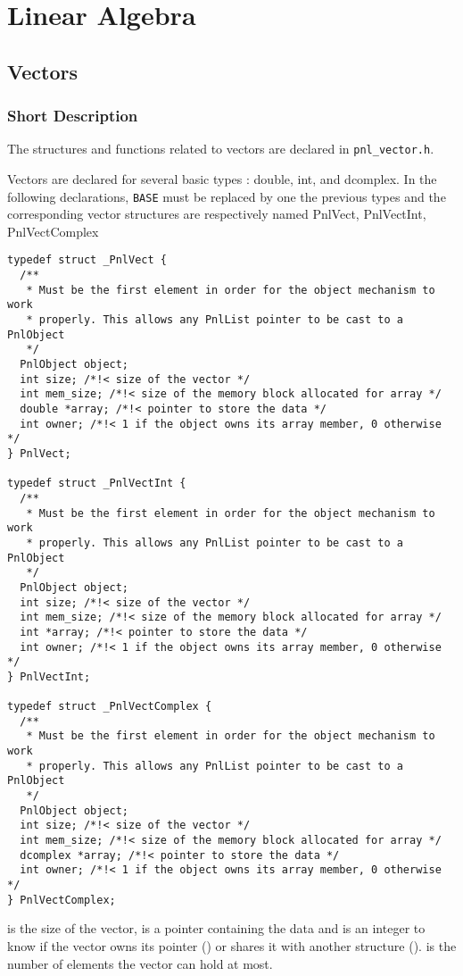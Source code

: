 \section{Linear Algebra}

\subsection{Vectors}
\subsubsection{Short Description}

The structures and functions related to vectors are declared in
\verb!pnl_vector.h!.


Vectors are declared for several basic types : double, int, and
dcomplex. In the following declarations, {\tt BASE} must be replaced by one
the previous types and the corresponding vector structures are respectively
named PnlVect, PnlVectInt, PnlVectComplex
\begin{verbatim}
typedef struct _PnlVect {
  /**
   * Must be the first element in order for the object mechanism to work
   * properly. This allows any PnlList pointer to be cast to a PnlObject
   */
  PnlObject object; 
  int size; /*!< size of the vector */
  int mem_size; /*!< size of the memory block allocated for array */
  double *array; /*!< pointer to store the data */
  int owner; /*!< 1 if the object owns its array member, 0 otherwise */
} PnlVect;

typedef struct _PnlVectInt {
  /**
   * Must be the first element in order for the object mechanism to work
   * properly. This allows any PnlList pointer to be cast to a PnlObject
   */
  PnlObject object; 
  int size; /*!< size of the vector */ 
  int mem_size; /*!< size of the memory block allocated for array */
  int *array; /*!< pointer to store the data */
  int owner; /*!< 1 if the object owns its array member, 0 otherwise */
} PnlVectInt;

typedef struct _PnlVectComplex {
  /**
   * Must be the first element in order for the object mechanism to work
   * properly. This allows any PnlList pointer to be cast to a PnlObject
   */
  PnlObject object; 
  int size; /*!< size of the vector */ 
  int mem_size; /*!< size of the memory block allocated for array */
  dcomplex *array; /*!< pointer to store the data */
  int owner; /*!< 1 if the object owns its array member, 0 otherwise */
} PnlVectComplex;
\end{verbatim}
 is the size of the vector,  is a pointer containing the
data and  is an integer to know if the vector owns its 
pointer () or shares it with another structure ().
 is the number of elements the vector can hold at most.

